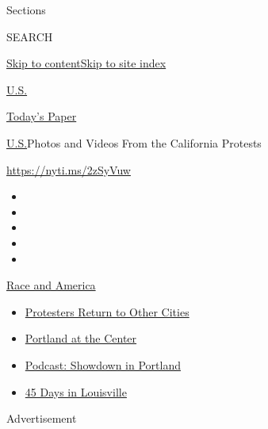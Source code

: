 Sections

SEARCH

\protect\hyperlink{site-content}{Skip to
content}\protect\hyperlink{site-index}{Skip to site index}

\href{https://www.nytimes.com/section/us}{U.S.}

\href{https://myaccount.nytimes.com/auth/login?response_type=cookie\&client_id=vi}{}

\href{https://www.nytimes.com/section/todayspaper}{Today's Paper}

\href{/section/us}{U.S.}\textbar{}Photos and Videos From the California
Protests

\url{https://nyti.ms/2zSyVuw}

\begin{itemize}
\item
\item
\item
\item
\item
\end{itemize}

\href{https://www.nytimes.com/news-event/george-floyd-protests-minneapolis-new-york-los-angeles?action=click\&pgtype=Article\&state=default\&region=TOP_BANNER\&context=storylines_menu}{Race
and America}

\begin{itemize}
\tightlist
\item
  \href{https://www.nytimes.com/2020/07/26/us/protests-portland-seattle-trump.html?action=click\&pgtype=Article\&state=default\&region=TOP_BANNER\&context=storylines_menu}{Protesters
  Return to Other Cities}
\item
  \href{https://www.nytimes.com/2020/07/24/us/portland-oregon-protests-white-race.html?action=click\&pgtype=Article\&state=default\&region=TOP_BANNER\&context=storylines_menu}{Portland
  at the Center}
\item
  \href{https://www.nytimes.com/2020/07/23/podcasts/the-daily/portland-protests.html?action=click\&pgtype=Article\&state=default\&region=TOP_BANNER\&context=storylines_menu}{Podcast:
  Showdown in Portland}
\item
  \href{https://www.nytimes.com/interactive/2020/07/16/us/black-lives-matter-protests-louisville-breonna-taylor.html?action=click\&pgtype=Article\&state=default\&region=TOP_BANNER\&context=storylines_menu}{45
  Days in Louisville}
\end{itemize}

Advertisement

